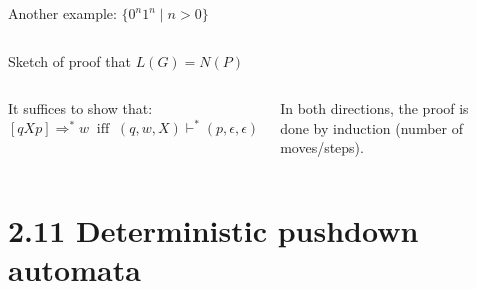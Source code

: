 \documentclass[handout]{beamer}
\begin{document}
\begin{frame}{Another example: $\{0^n1^n\mid n>0\}$}
\begin{columns}
        \begin{center}
        \end{center}

    \end{columns}

\end{frame}


\begin{frame}{Sketch of proof that $L(G)=N(P)$}

    \begin{columns}


        It suffices to show that:
        $$
        [qXp]\Rightarrow^*w\ \text{ iff }\ (q,w,X)\vdash^*(p,\epsilon,\epsilon)
        $$

        In both directions, the proof is done by induction (number of moves/steps).
        

        \begin{center}
                
        \end{center}

        \hfill\qedsymbol
                
    \end{columns}

\end{frame}


\section*{2.11 Deterministic pushdown automata}
\end{document}
